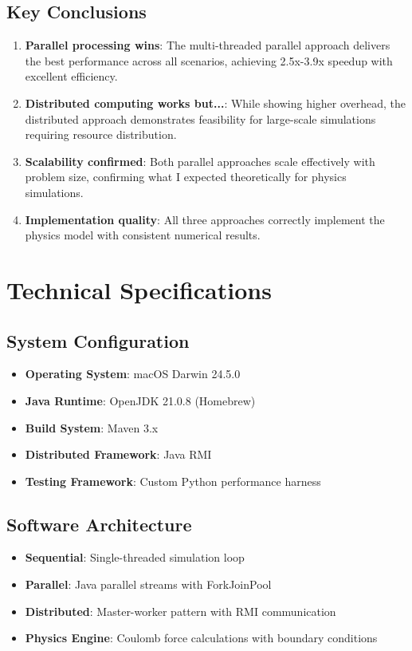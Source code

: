 \documentclass[12pt,a4paper]{article}
\begin{document}
\subsection{Key Conclusions}

\begin{enumerate}
    \item \textbf{Parallel processing wins}: The multi-threaded parallel approach delivers the best performance across all scenarios, achieving 2.5x-3.9x speedup with excellent efficiency.
    
    \item \textbf{Distributed computing works but...}: While showing higher overhead, the distributed approach demonstrates feasibility for large-scale simulations requiring resource distribution.
    
    \item \textbf{Scalability confirmed}: Both parallel approaches scale effectively with problem size, confirming what I expected theoretically for physics simulations.
    
    \item \textbf{Implementation quality}: All three approaches correctly implement the physics model with consistent numerical results.
\end{enumerate}


\section{Technical Specifications}

\subsection{System Configuration}
\begin{itemize}
    \item \textbf{Operating System}: macOS Darwin 24.5.0
    \item \textbf{Java Runtime}: OpenJDK 21.0.8 (Homebrew)
    \item \textbf{Build System}: Maven 3.x
    \item \textbf{Distributed Framework}: Java RMI
    \item \textbf{Testing Framework}: Custom Python performance harness
\end{itemize}

\subsection{Software Architecture}
\begin{itemize}
    \item \textbf{Sequential}: Single-threaded simulation loop
    \item \textbf{Parallel}: Java parallel streams with ForkJoinPool
    \item \textbf{Distributed}: Master-worker pattern with RMI communication
    \item \textbf{Physics Engine}: Coulomb force calculations with boundary conditions
\end{itemize}
\end{document}
